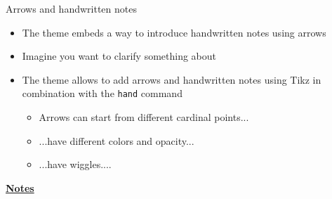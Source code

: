 \documentclass[10pt]{beamer}
\begin{document}
\begin{frame}[t]
    {Arrows and handwritten notes}\bigskip
    \begin{itemize}
        \item The theme embeds a way to introduce handwritten notes using arrows \bigskip\medskip
        \item Imagine you want to clarify something about  \bigskip\medskip
        \item The theme allows to add arrows and handwritten notes using Tikz in combination with the \texttt{hand} command \medskip
        \begin{itemize}
            \item Arrows can start from different cardinal points... \medskip
            \item ...have different colors and opacity... \medskip
            \item ...have wiggles....
        \end{itemize}
    \end{itemize}
\end{frame}
\begin{flushleft}
    \underline{\textbf{Notes}}\setlength{\parskip}{.15cm}\notesize\newline\par
\end{flushleft}
\end{document}
